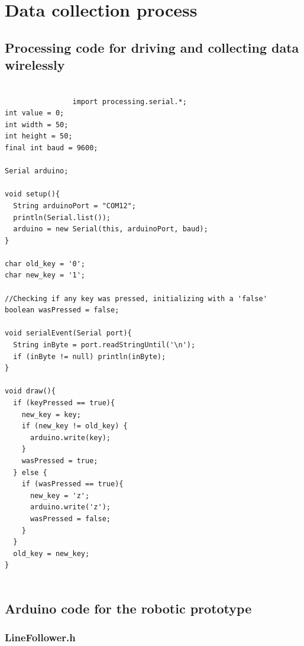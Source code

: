 \documentclass[14pt,a4paper]{extarticle}
\begin{document}
	
	\section{Data collection process}
	
	\subsection{Processing code for driving and collecting data wirelessly}
	
		\begin{verbatim}
		
				import processing.serial.*;
int value = 0;
int width = 50;
int height = 50;
final int baud = 9600;

Serial arduino;

void setup(){
  String arduinoPort = "COM12";
  println(Serial.list());
  arduino = new Serial(this, arduinoPort, baud);
}

char old_key = '0';
char new_key = '1';

//Checking if any key was pressed, initializing with a 'false'
boolean wasPressed = false;

void serialEvent(Serial port){
  String inByte = port.readStringUntil('\n');
  if (inByte != null) println(inByte);
}

void draw(){
  if (keyPressed == true){
    new_key = key;
    if (new_key != old_key) {
      arduino.write(key);
    }
    wasPressed = true;
  } else {
    if (wasPressed == true){
      new_key = 'z';
      arduino.write('z');
      wasPressed = false;
    }
  }
  old_key = new_key;
}
		
		\end{verbatim}

	\subsection{Arduino code for the robotic prototype}
	
	\subsubsection{LineFollower.h}
	
\end{document}
